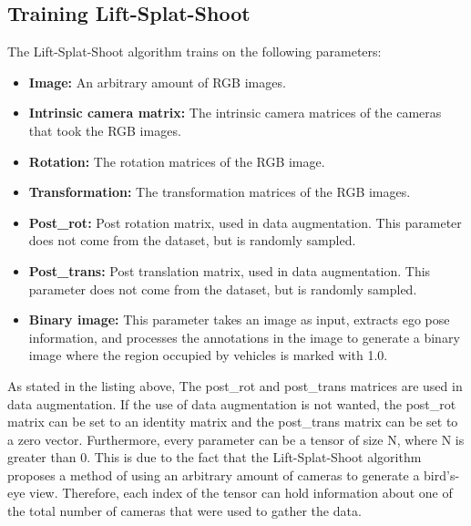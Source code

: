 \documentclass{uva-inf-bachelor-thesis}
\begin{document}
        \subsection{Training Lift-Splat-Shoot}
            The Lift-Splat-Shoot algorithm trains on the following parameters: 
            \begin{itemize}
                \item \textbf{Image:} An arbitrary amount of RGB images.
                \item \textbf{Intrinsic camera matrix:} The intrinsic camera matrices of the cameras that took the RGB images.
                \item \textbf{Rotation:} The rotation matrices of the RGB image.
                \item \textbf{Transformation:} The transformation matrices of the RGB images.
                \item \textbf{Post\_rot:} Post rotation matrix, used in data augmentation. This parameter does not come from the dataset, but is randomly sampled.
                \item \textbf{Post\_trans:} Post translation matrix, used in data augmentation. This parameter does not come from the dataset, but is randomly sampled.
                \item \textbf{Binary image:} This parameter takes an image as input, extracts ego pose information, and processes the annotations in the image to generate a binary image where the region occupied by vehicles is marked with 1.0.
            \end{itemize}
            As stated in the listing above, The post\_rot and post\_trans matrices are used in data augmentation. If the use of data augmentation is not wanted, the post\_rot matrix can be set to an identity matrix and the post\_trans matrix can be set to a zero vector. Furthermore, every parameter can be a tensor of size N, where N is greater than 0. This is due to the fact that the Lift-Splat-Shoot algorithm proposes a method of using an arbitrary amount of cameras to generate a bird's-eye view. Therefore, each index of the tensor can hold information about one of the total number of cameras that were used to gather the data.
\end{document}
